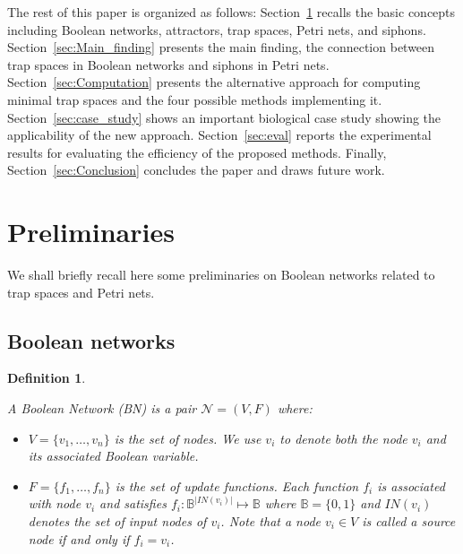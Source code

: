 \documentclass[preprint,12pt]{elsarticle}
\newtheorem{definition}{Definition}[section]
\newcommand{\IN}{\mathit{IN}}
\begin{document}
The rest of this paper is organized as follows: Section~\ref{sec:Preliminaries} recalls the basic concepts including Boolean networks, attractors, trap spaces, Petri nets, and siphons.
Section~\ref{sec:Main_finding} presents the main finding, the connection between trap spaces in Boolean networks and siphons in Petri nets.
Section~\ref{sec:Computation} presents the alternative approach for computing minimal trap spaces and the four possible methods implementing it.
Section~\ref{sec:case_study} shows an important biological case study showing the applicability of the new approach.
Section~\ref{sec:eval} reports the experimental results for evaluating the efficiency of the proposed methods.
Finally, Section~\ref{sec:Conclusion} concludes the paper and draws future work.

\section{Preliminaries}%
\label{sec:Preliminaries}

We shall briefly recall here some preliminaries on Boolean networks related to trap spaces and Petri nets.

\subsection{Boolean networks}

\begin{definition}%
\label{def:BN}

  A Boolean Network (BN) is a pair \(\mathcal{N} = (V, F)\) where:
  \begin{itemize}
    \item \(V = \{v_1, \dots, v_n\}\) is the set of nodes.
    We use \(v_i\) to denote both the node \(v_i\) and its associated Boolean variable.

    \item \(F = \{f_1, \dots, f_n\}\) is the set of update functions.
    Each function \(f_i\) is associated with node \(v_i\) and satisfies \(f_i \colon \mathbb{B}^{\vert \IN(v_i)\vert} \mapsto \mathbb{B}\) where \(\mathbb{B} = \{0, 1\}\) and \(\IN(v_i)\) denotes the set of input nodes of \(v_i\).
    Note that a node \(v_i \in V\) is called a \emph{source} node if and only if \(f_{i} = v_i\).
  \end{itemize}

\end{definition}
\end{document}
